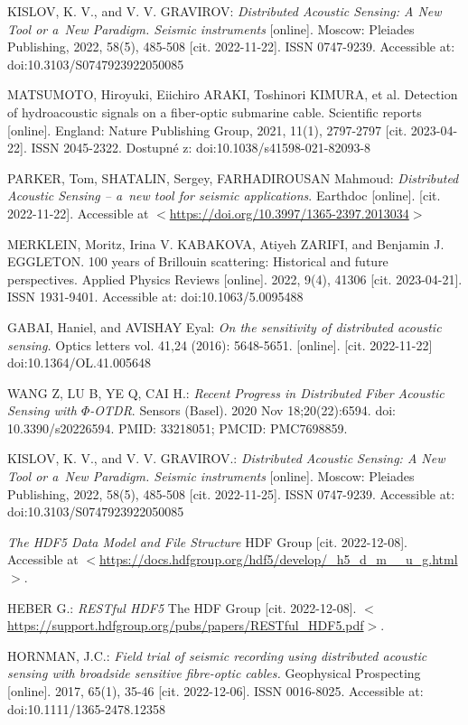 \begin{thebibliography}{99}
KISLOV, K. V., and V. V. GRAVIROV: \emph{Distributed Acoustic Sensing: A New Tool or a~New Paradigm. Seismic instruments} [online]. Moscow: Pleiades Publishing, 2022, 58(5), 485-508 [cit. 2022-11-22]. ISSN 0747-9239. Accessible at: doi:10.3103/S0747923922050085

MATSUMOTO, Hiroyuki, Eiichiro ARAKI, Toshinori KIMURA, et al. Detection of hydroacoustic signals on a fiber-optic submarine cable. Scientific reports [online]. England: Nature Publishing Group, 2021, 11(1), 2797-2797 [cit. 2023-04-22]. ISSN 2045-2322. Dostupné z: doi:10.1038/s41598-021-82093-8

PARKER, Tom, SHATALIN, Sergey, FARHADIROUSAN Mahmoud: \emph{Distributed Acoustic Sensing – a~new tool for seismic applications}. Earthdoc [online]. [cit. 2022-11-22]. Accessible at \(<\)\url{https://doi.org/10.3997/1365-2397.2013034}\(>\)

MERKLEIN, Moritz, Irina V. KABAKOVA, Atiyeh ZARIFI, and Benjamin J. EGGLETON. 100 years of Brillouin scattering: Historical and future perspectives. Applied Physics Reviews [online]. 2022, 9(4), 41306 [cit. 2023-04-21]. ISSN 1931-9401. Accessible at: doi:10.1063/5.0095488

GABAI, Haniel, and AVISHAY Eyal: \emph{On the sensitivity of distributed acoustic sensing.} Optics letters vol. 41,24 (2016): 5648-5651. [online]. [cit. 2022-11-22] doi:10.1364/OL.41.005648

WANG Z, LU B, YE Q, CAI H.: \emph{Recent Progress in Distributed Fiber Acoustic Sensing with $\Phi$-OTDR}. Sensors (Basel). 2020 Nov 18;20(22):6594. doi: 10.3390/s20226594. PMID: 33218051; PMCID: PMC7698859.

KISLOV, K. V.,  and V. V. GRAVIROV.: \emph{Distributed Acoustic Sensing: A New Tool or a~New Paradigm. Seismic instruments} [online]. Moscow: Pleiades Publishing, 2022, 58(5), 485-508 [cit. 2022-11-25]. ISSN 0747-9239. Accessible at: doi:10.3103/S0747923922050085

\emph{The HDF5 Data Model and File Structure} HDF Group [cit. 2022-12-08]. Accessible at \(<\)\url{https://docs.hdfgroup.org/hdf5/develop/_h5_d_m__u_g.html}\(>\).

HEBER G.: \emph{RESTful HDF5} The HDF Group [cit. 2022-12-08].
\(<\)\url{https://support.hdfgroup.org/pubs/papers/RESTful_HDF5.pdf}\(>\).

HORNMAN, J.C.: \emph{Field trial of seismic recording using distributed acoustic sensing with broadside sensitive fibre-optic cables.} Geophysical Prospecting [online]. 2017, 65(1), 35-46 [cit. 2022-12-06]. ISSN 0016-8025. Accessible at: doi:10.1111/1365-2478.12358


\end{thebibliography}
